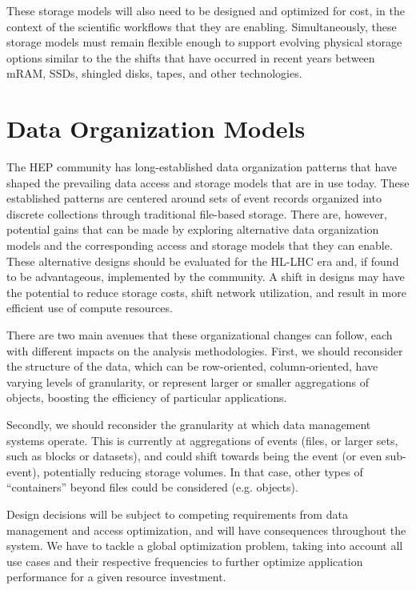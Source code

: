 \documentclass[12pt,a4paper]{article}
\begin{document}
These storage models will also need to be designed and optimized for
cost, in the context of the scientific workflows that they are enabling.
Simultaneously, these storage models must remain flexible enough to
support evolving physical storage options similar to the the shifts that
have occurred in recent years between mRAM, SSDs, shingled disks, tapes,
and other technologies.

\section{Data Organization Models}\label{data-organization-models}

The HEP community has long-established data organization patterns that have
shaped the prevailing data access and storage
models that are in use today. These established patterns are centered
around sets of event records organized into discrete collections through
traditional file-based storage. There are, however, potential gains that
can be made by exploring alternative data organization models and the
corresponding access and storage models that they can enable. These
alternative designs should be evaluated for the HL-LHC era and, if found
to be advantageous, implemented by the community. A shift in designs may
have the potential to reduce storage costs, shift network utilization,
and result in more efficient use of compute resources.

There are two main avenues that these organizational changes can follow,
each with different impacts on the analysis methodologies. First, we
should reconsider the structure of the data, which can be row-oriented,
column-oriented, have varying levels of granularity, or represent larger or
smaller aggregations of objects, boosting the efficiency of
particular applications.

Secondly, we should reconsider the granularity at which data management
systems operate. This is currently at aggregations of events (files, or
larger sets, such as blocks or datasets), and could shift towards being
the event (or even sub-event), potentially reducing storage volumes. In
that case, other types of ``containers'' beyond files could be considered
(e.g. objects).

Design decisions will be subject to competing requirements from data
management and access optimization, and will have consequences
throughout the system. We have to tackle a global optimization problem,
taking into account all use cases and their respective frequencies to
further optimize application performance for a given resource
investment.
\end{document}
